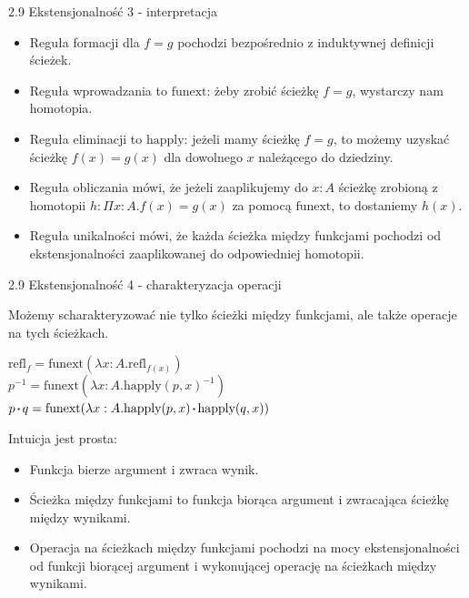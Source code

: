\documentclass{beamer}
\newcommand{\refl}[1]{\text{refl}_{#1}}
\newcommand*\sq{\mathbin{\vcenter{\hbox{\rule{.3ex}{.3ex}}}}}
\newcommand{\happly}{\text{happly}}
\newcommand{\funext}{\text{funext}}
\begin{document}
\begin{frame}{2.9 Ekstensjonalność 3 - interpretacja}
\begin{itemize}
	\item Reguła formacji dla $f = g$ pochodzi bezpośrednio z induktywnej definicji ścieżek.
	\item Reguła wprowadzania to $\funext$: żeby zrobić ścieżkę $f = g$, wystarczy nam homotopia.
	\item Reguła eliminacji to $\happly$: jeżeli mamy ścieżkę $f = g$, to możemy uzyskać ścieżkę $f(x) = g(x)$ dla dowolnego $x$ należącego do dziedziny.
	\item Reguła obliczania mówi, że jeżeli zaaplikujemy do $x : A$ ścieżkę zrobioną z homotopii $h : \Pi x : A. f(x) = g(x)$ za pomocą $\funext$, to dostaniemy $h(x)$.
	\item Reguła unikalności mówi, że każda ścieżka między funkcjami pochodzi od ekstensjonalności zaaplikowanej do odpowiedniej homotopii.
\end{itemize}
\end{frame}

\begin{frame}{2.9 Ekstensjonalność 4 - charakteryzacja operacji}

Możemy scharakteryzować nie tylko ścieżki między funkcjami, ale także operacje na tych ścieżkach.

\begin{theorem}
$\refl{f} = \funext(\lambda x : A. \refl{f(x)})$ \\

$p^{-1} = \funext(\lambda x : A. \happly(p, x)^{-1})$ \\

$p \sq q = \funext(\lambda x : A. \happly(p, x) \sq \happly(q, x))$
\end{theorem}

Intuicja jest prosta:
\begin{itemize}
	\item Funkcja bierze argument i zwraca wynik.
	\item Ścieżka między funkcjami to funkcja biorąca argument i zwracająca ścieżkę między wynikami.
	\item Operacja na ścieżkach między funkcjami pochodzi na mocy ekstensjonalności od funkcji biorącej argument i wykonującej operację na ścieżkach między wynikami.
\end{itemize}

\end{frame}
\end{document}
